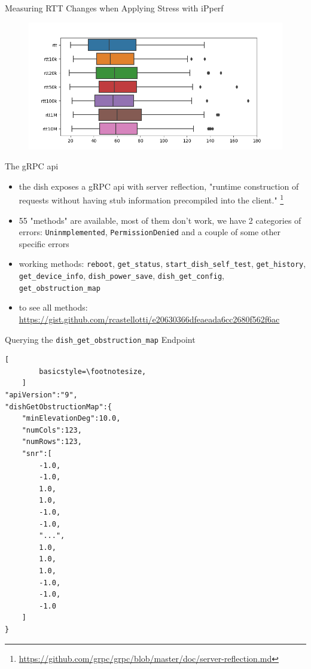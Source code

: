 \documentclass[NET,english,beameralt]{tumbeamer}
\begin{document}
\begin{frame}{Measuring RTT Changes when Applying Stress with iPperf}
    \begin{figure}
        \includegraphics[width=1\textwidth]{pics/rtt-iperf-stress.png}
    \end{figure}
    \end{frame}

\begin{frame}{The gRPC api}
    \begin{itemize}
        \item the dish exposes a gRPC api with server reflection, "runtime construction of requests without having stub
        information precompiled into the client."
        \footnote{\href{https://github.com/grpc/grpc/blob/master/doc/server-reflection.md}{https://github.com/grpc/grpc/blob/master/doc/server-reflection.md}}
        \item 55 "methods" are available, most of them don't work, we have 2 categories of errors: \texttt{Uninmplemented},
        \texttt{PermissionDenied} and a couple of some other specific errors 
        \item working methods: \texttt{reboot}, \texttt{get\_status}, \texttt{start\_dish\_self\_test}, \texttt{get\_history}, \texttt{get\_device\_info}, \texttt{dish\_power\_save}, \texttt{dish\_get\_config}, \texttt{get\_obstruction\_map}
        \item to see all methods:
        \href{https://gist.github.com/rcastellotti/e20630366dfeaeada6cc2680f562f6ac}{https://gist.github.com/rcastellotti/e20630366dfeaeada6cc2680f562f6ac}
    \end{itemize}
\end{frame}

\begin{frame}[fragile]{Querying the  \texttt{dish\_get\_obstruction\_map} Endpoint }
    \begin{lstlisting}[
        basicstyle=\footnotesize,
    ]
"apiVersion":"9",
"dishGetObstructionMap":{
    "minElevationDeg":10.0,
    "numCols":123,
    "numRows":123,
    "snr":[
        -1.0,
        -1.0,
        1.0,
        1.0,
        -1.0,
        -1.0,
        "...",
        1.0,
        1.0,
        1.0,
        -1.0,
        -1.0,
        -1.0
    ]
}
    \end{lstlisting}
\end{frame}
\end{document}
